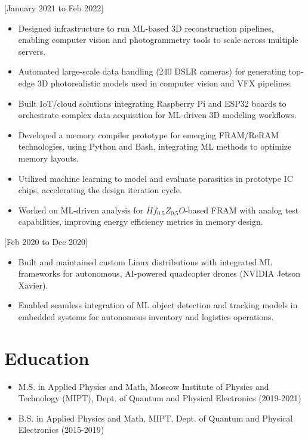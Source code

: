 \documentclass{article}
\begin{document}
[January 2021 to Feb 2022]
\begin{itemize}
   \item Designed infrastructure to run ML-based 3D reconstruction pipelines, enabling computer vision and photogrammetry tools to scale across multiple servers.
   \item Automated large-scale data handling (240 DSLR cameras) for generating top-edge 3D photorealistic models used in computer vision and VFX pipelines.
   \item Built IoT/cloud solutions integrating Raspberry Pi and ESP32 boards to orchestrate complex data acquisition for ML-driven 3D modeling workflows.
\end{itemize}

\begin{itemize}
   \item Developed a memory compiler prototype for emerging FRAM/ReRAM technologies, using Python and Bash, integrating ML methods to optimize memory layouts.
   \item Utilized machine learning to model and evaluate parasitics in prototype IC chips, accelerating the design iteration cycle.
   \item Worked on ML-driven analysis for $Hf_{0.5}Z_{0.5}O$-based FRAM with analog test capabilities, improving energy efficiency metrics in memory design.
\end{itemize}

[Feb 2020 to Dec 2020]
\begin{itemize}
   \item Built and maintained custom Linux distributions with integrated ML frameworks for autonomous, AI-powered quadcopter drones (NVIDIA Jetson Xavier).
   \item Enabled seamless integration of ML object detection and tracking models in embedded systems for autonomous inventory and logistics operations.
\end{itemize}

\section{Education}
\begin{itemize}
\item M.S. in Applied Physics and Math, Moscow Institute of Physics and Technology (MIPT), Dept. of Quantum and Physical Electronics (2019-2021)
\item B.S. in Applied Physics and Math, MIPT, Dept. of Quantum and Physical Electronics (2015-2019)
\end{itemize}
\end{document}
